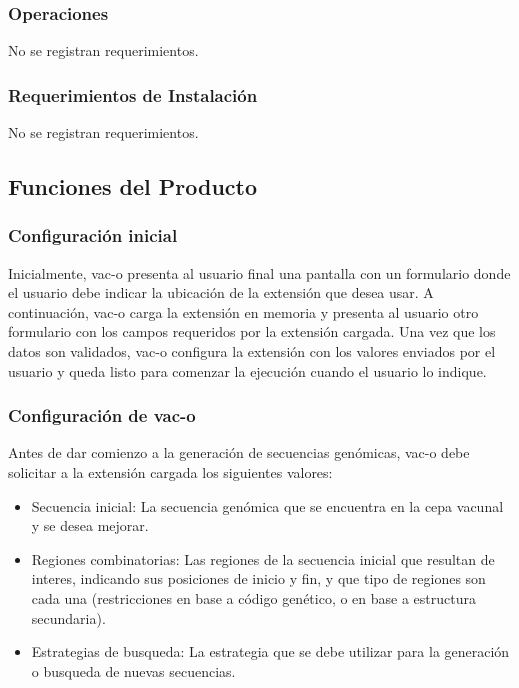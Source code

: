 \documentclass[10pt,a4paper]{article}
\begin{document}
    \subsubsection{Operaciones}
    No se registran requerimientos.

    \subsubsection{Requerimientos de Instalaci\'on}
    No se registran requerimientos.

  \subsection{Funciones del Producto}
  
  \subsubsection{Configuraci\'on inicial}
  Inicialmente, vac-o presenta al usuario final una pantalla con un formulario donde el usuario debe indicar la ubicaci\'on de la extensi\'on que desea usar. A continuaci\'on, vac-o carga la extensi\'on en memoria y presenta al usuario otro formulario con los campos requeridos por la extensi\'on cargada.
  Una vez que los datos son validados, vac-o configura la extensi\'on con los valores enviados por el usuario y queda listo para comenzar la ejecuci\'on cuando el usuario lo indique.

  \subsubsection{Configuraci\'on de vac-o}
  Antes de dar comienzo a la generaci\'on de secuencias gen\'omicas, vac-o debe solicitar a la extensi\'on cargada los siguientes valores:
  \begin{itemize}
    \item Secuencia inicial: La secuencia gen\'omica que se encuentra en la cepa vacunal y se desea mejorar.
    \item Regiones combinatorias: Las regiones de la secuencia inicial que resultan de interes, indicando sus posiciones de inicio y fin, y que tipo de regiones son cada una (restricciones en base a c\'odigo gen\'etico, o en base a estructura secundaria).
    \item Estrategias de busqueda: La estrategia que se debe utilizar para la generaci\'on o busqueda de nuevas secuencias.
  \end{itemize}
  
\end{document}
